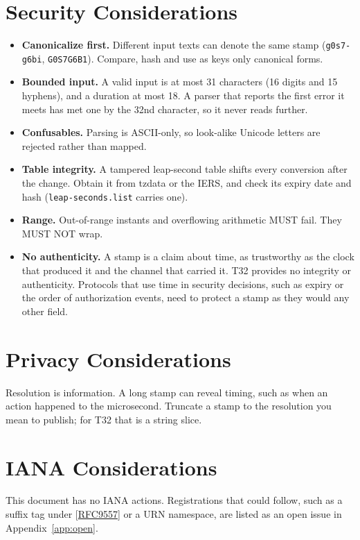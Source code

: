 \documentclass[11pt]{article}
\newcommand{\lit}[1]{\texttt{#1}}
\newcommand{\App}[1]{Appendix~\ref{#1}}
\newcommand{\xref}[1]{[\hyperref[ref:#1]{#1}]}
\begin{document}
\section{Security Considerations}\label{sec:security}

\begin{itemize}
\item \textbf{Canonicalize first.} Different input texts can denote the same
stamp (\lit{g0s7-g6bi}, \lit{G0S7G6B1}). Compare, hash and use as keys only
canonical forms.
\item \textbf{Bounded input.} A valid input is at most 31 characters (16
digits and 15 hyphens), and a duration at most 18. A parser that reports the
first error it meets has met one by the 32nd character, so it never reads
further.
\item \textbf{Confusables.} Parsing is ASCII-only, so look-alike Unicode
letters are rejected rather than mapped.
\item \textbf{Table integrity.} A tampered leap-second table shifts every
conversion after the change. Obtain it from tzdata or the IERS, and check its
expiry date and hash (\lit{leap-seconds.list} carries one).
\item \textbf{Range.} Out-of-range instants and overflowing arithmetic MUST
fail. They MUST NOT wrap.
\item \textbf{No authenticity.} A stamp is a claim about time, as trustworthy
as the clock that produced it and the channel that carried it. T32 provides no
integrity or authenticity. Protocols that use time in security decisions, such
as expiry or the order of authorization events, need to protect a stamp as
they would any other field.
\end{itemize}

\section{Privacy Considerations}\label{sec:privacy}

Resolution is information. A long stamp can reveal timing, such as when an
action happened to the microsecond. Truncate a stamp to the resolution you
mean to publish; for T32 that is a string slice.

\section{IANA Considerations}\label{sec:iana}

This document has no IANA actions. Registrations that could follow, such as a
suffix tag under \xref{RFC9557} or a URN namespace, are listed as an open issue
in \App{app:open}.
\end{document}
